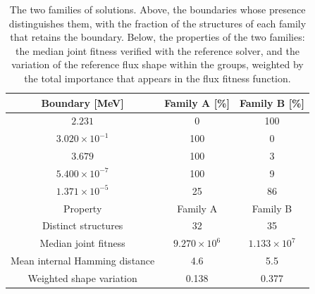 \begin{table}[htbp]
\centering
\caption{The two families of solutions. Above, the boundaries whose presence
distinguishes them, with the fraction of the structures of each family that
retains the boundary. Below, the properties of the two families: the median
joint fitness verified with the reference solver, and the variation of the
reference flux shape within the groups, weighted by the total importance that
appears in the flux fitness function.}
\label{tab:families}
\begin{tabular}{ccc}
\hline
Boundary [MeV] & Family A [\%] & Family B [\%] \\ \hline
    $2.231$ & 0 & 100 \\
    $3.020\times10^{-1}$ & 100 & 0 \\
    $3.679$ & 100 & 3 \\
    $5.400\times10^{-7}$ & 100 & 9 \\
    $1.371\times10^{-5}$ & 25 & 86 \\
\hline
    Property & Family A & Family B \\ \hline
    Distinct structures & 32 & 35 \\
    Median joint fitness & $9.270\times10^{6}$ & $1.133\times10^{7}$ \\
    Mean internal Hamming distance & 4.6 & 5.5 \\
    Weighted shape variation & 0.138 & 0.377 \\ \hline
\end{tabular}
\end{table}
